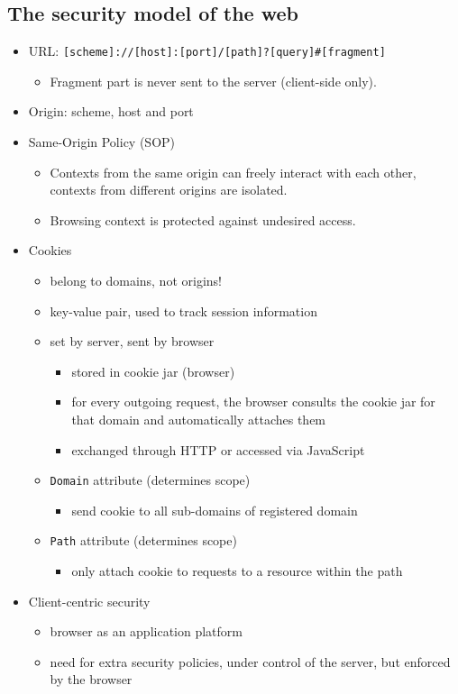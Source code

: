 \documentclass[12pt,titlepage,a4paper]{report}
\begin{document}
			\subsection{The security model of the web}
			\begin{itemize}
				\item URL: \texttt{[scheme]://[host]:[port]/[path]?[query]\#[fragment]}
				\begin{itemize}
					\item Fragment part is never sent to the server (client-side only).
				\end{itemize}
				\item Origin: scheme, host and port
				\item Same-Origin Policy (SOP)
				\begin{itemize}
					\item Contexts from the same origin can freely interact with each other, contexts from different origins are isolated.
					\item Browsing context is protected against undesired access.
				\end{itemize}
				
				\item Cookies
				\begin{itemize}
					\item belong to domains, not origins!
					\item key-value pair, used to track session information
					\item set by server, sent by browser
					\begin{itemize}
						\item stored in cookie jar (browser)
						\item for every outgoing request, the browser consults the cookie jar for that domain and automatically attaches them
						\item exchanged through HTTP or accessed via JavaScript
					\end{itemize}
					\item \texttt{Domain} attribute (determines scope)
					\begin{itemize}
						\item send cookie to all sub-domains of registered domain
					\end{itemize}
					\item \texttt{Path} attribute (determines scope)
					\begin{itemize}
						\item only attach cookie to requests to a resource within the path
					\end{itemize}
				\end{itemize}
				
				\item Client-centric security
				\begin{itemize}
					\item browser as an application platform
					\item need for extra security policies, under control of the server, but enforced by the browser
				\end{itemize}
			\end{itemize}
\end{document}
